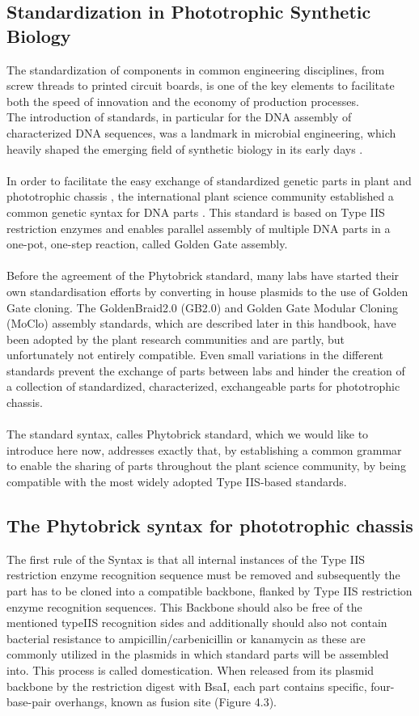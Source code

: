 \subsection*{Standardization in Phototrophic Synthetic Biology}
The standardization of components in common engineering disciplines, from screw threads to printed circuit boards, is one of the key elements to facilitate both the speed of innovation and the economy of production processes. \\
The introduction of standards, in particular for the DNA assembly of characterized DNA sequences, was a landmark in microbial engineering, which heavily shaped the emerging field of synthetic biology in its early days . \\ \\
In order to facilitate the easy exchange of standardized genetic parts in plant and phototrophic chassis , the international plant science community established a common genetic syntax for DNA parts \parencite{Patron2015}. This standard is based on Type IIS restriction enzymes and enables parallel assembly of multiple DNA parts in a one-pot, one-step reaction, called Golden Gate assembly. \\ \\
Before the agreement of the  Phytobrick standard, many labs have started their own standardisation efforts by converting in house plasmids to the use of Golden Gate cloning. The GoldenBraid2.0 (GB2.0) and Golden Gate Modular Cloning (MoClo) assembly standards, which are described later in this handbook, have been adopted by the plant research communities and are partly, but unfortunately not entirely compatible.  Even small variations in the different standards prevent the exchange of parts between labs and hinder the creation of a collection of standardized, characterized, exchangeable parts for phototrophic chassis. \\ \\
The standard syntax, calles Phytobrick standard, which we would like to introduce here now, addresses exactly that, by establishing a common grammar to enable the sharing of parts throughout the plant science community, by being compatible with the most widely adopted Type IIS-based standards.

\subsection*{The Phytobrick syntax for phototrophic chassis}
The first rule of the Syntax is that all internal instances of the Type IIS restriction enzyme recognition sequence must be removed and subsequently the part has to be cloned into a compatible backbone, flanked by Type IIS restriction enzyme recognition sequences. This Backbone should also be free of the mentioned typeIIS recognition sides and additionally should also not contain bacterial resistance to ampicillin/carbenicillin or kanamycin as these are commonly utilized in the plasmids in which standard parts will be assembled into. This process is called domestication. When released from its plasmid backbone by the restriction digest with BsaI, each part contains specific, four-base-pair overhangs, known as fusion site (Figure 4.3).

